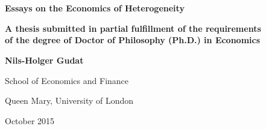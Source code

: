 \begin{titlepage}
\thispagestyle{plain}
\hfill\\
\hfill\\
\vspace{1cm}

\begin{center}
\textbf{\LARGE Essays on the Economics of Heterogeneity}

\vspace{3cm}

\textbf{\normalsize A thesis submitted in partial fulfillment of the requirements \\
\medskip
of the degree of Doctor of Philosophy (Ph.D.) in Economics \\
}

\vspace{3cm}

\textbf{\large Nils-Holger Gudat}

\medskip



\vspace{40pt}

School of Economics and Finance\medskip

Queen Mary, University of London\medskip

October 2015\medskip
\vspace{40pt}


\end{center}
\end{titlepage}
\endinput

